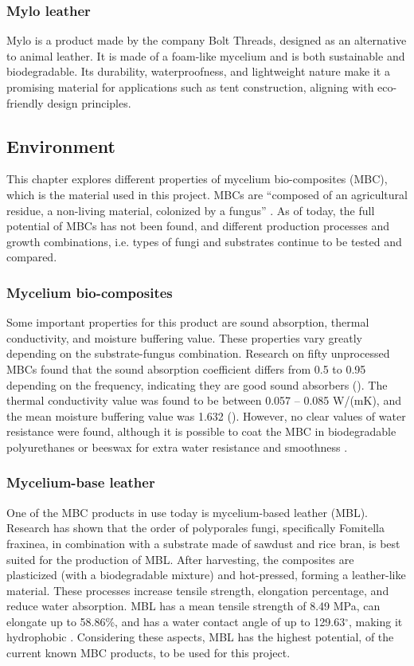 \documentclass{article}
\begin{document}
\subsubsection{Mylo leather}
Mylo is a product made by the company Bolt Threads, designed as an alternative to animal
leather. It is made of a foam-like mycelium \parencite{myloleather} and
is both sustainable and biodegradable. Its durability, waterproofness, and lightweight
nature make it a promising material for applications such as tent construction, aligning
with eco-friendly design principles.

\subsection{Environment}
This chapter explores different properties of mycelium bio-composites (MBC), which is the
material used in this project. MBCs are ``composed of an agricultural residue, a non-living
material, colonized by a fungus'' \parencite{amziane2023bio, p. 740}. As of today, the full
potential of MBCs has not been found, and different production processes and growth
combinations, i.e. types of fungi and substrates continue to be tested and compared.

\subsubsection{Mycelium bio-composites}
Some important properties for this product are sound absorption, thermal conductivity, and
moisture buffering value. These properties vary greatly depending on the substrate-fungus
combination. Research on fifty unprocessed MBCs found that the sound absorption coefficient
differs from 0.5 to 0.95 depending on the frequency, indicating they are good sound
absorbers (\cite{amziane2023bio, p.749}). The thermal conductivity value was found to be
between 0.057 -- 0.085 W/(mK), and the mean moisture buffering value was 1.632
(\cite{amziane2023bio, p.749}). However, no clear values of water resistance were found,
although it is possible to coat the MBC in biodegradable polyurethanes or beeswax for
extra water resistance and smoothness \parencite{amziane2023bio}.

\subsubsection{Mycelium-base leather}
One of the MBC products in use today is mycelium-based leather (MBL). Research has shown
that the order of polyporales fungi, specifically Fomitella fraxinea, in combination with
a substrate made of sawdust and rice bran, is best suited for the production of MBL. After
harvesting, the composites are plasticized (with a biodegradable mixture) and hot-pressed,
forming a leather-like material. These processes increase tensile strength, elongation
percentage, and reduce water absorption. MBL has a mean tensile strength of 8.49 MPa, can
elongate up to 58.86\%, and has a water contact angle of up to 129.63$^\circ$, making it
hydrophobic \parencite{jof8030317}. Considering these aspects, MBL has the highest
potential, of the current known MBC products, to be used for this project. 
\end{document}
